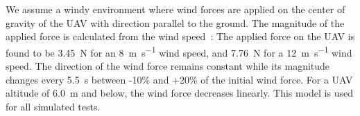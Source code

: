 \documentclass[conference]{IEEEtran}
\begin{document}


We assume a windy environment where %
wind forces are applied on the
center of gravity of the UAV with direction parallel to the ground. The magnitude of the applied force %
is calculated from the wind speed~\cite{Dynamic_pressure_NASA,anderson2010fundamentals}:
The applied force on the UAV is found
to be \SI{3.45}{\newton} for an \SI{8}{\m \per \s} wind speed, and 
\SI{7.76}{\newton} for a \SI{12}{\m \per \s}
wind speed. %
The direction of the wind force remains constant while its magnitude changes every \SI{5.5}{\second} between -10\% and +20\% of the initial wind force. %
For a UAV altitude of \SI{6.0}{\meter} and below, the wind force decreases linearly. This model is used for all simulated tests.
\end{document}
